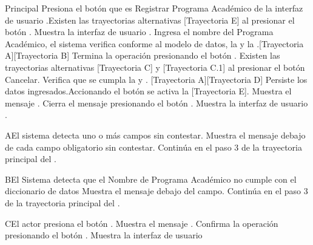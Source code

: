 \begin{UCtrayectoria}{Principal}
    \UCpaso[\UCactor] Presiona el botón \IUbutton{(+)} que es Registrar Programa Académico de la interfaz de usuario .Existen las trayectorias alternativas [Trayectoria E] al presionar el botón \IUbutton{(+)}.
    \UCpaso Muestra la interfaz de usuario .
    \UCpaso[\UCactor] Ingresa el nombre del Programa Académico, el sistema verifica conforme al modelo de datos, la  y la .[Trayectoria A][Trayectoria B]
    \UCpaso[\UCactor] Termina la operación presionando el botón . Existen las trayectorias alternativas [Trayectoria C] y [Trayectoria C.1] al presionar el botón Cancelar.
    \UCpaso Verifica que se cumpla la  y . [Trayectoria A][Trayectoria D]
    \UCpaso Persiste los datos ingresados.Accionando el botón  se activa la  [Trayectoria E].
    \UCpaso Muestra el mensaje .
    \UCpaso[\UCactor] Cierra el mensaje presionando el botón .
    \UCpaso Muestra la interfaz de usuario .
\end{UCtrayectoria}


\begin{UCtrayectoriaA}{A}{El sistema detecta uno o más campos sin contestar.}
    \UCpaso Muestra el mensaje  debajo de cada campo obligatorio sin contestar.
    \UCpaso Continúa en el paso 3 de la trayectoria principal del .
\end{UCtrayectoriaA}


\begin{UCtrayectoriaA}{B}{El Sistema detecta que el Nombre de Programa Académico no cumple con el diccionario de datos}
    \UCpaso Muestra el mensaje  debajo del campo.
    \UCpaso Continúa en el paso 3 de la trayectoria principal del .
\end{UCtrayectoriaA}
\begin{UCtrayectoriaA}{C}{El actor presiona el botón .}
    \UCpaso Muestra el mensaje .
    \UCpaso[\UCactor] Confirma la operación presionando el botón .
    \UCpaso Muestra la interfaz de usuario 
\end{UCtrayectoriaA}

